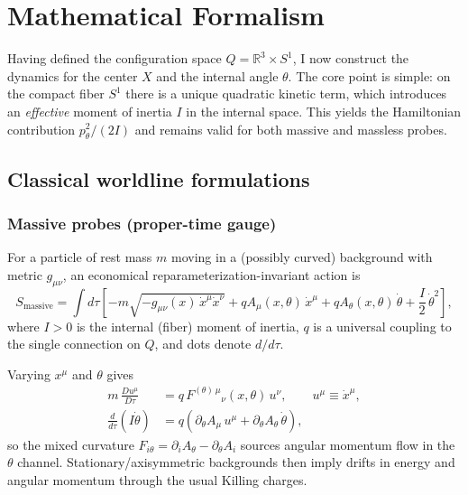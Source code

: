 \section{Mathematical Formalism}
\label{sec:math_formalism}

Having defined the configuration space $Q=\mathbb{R}^3\times S^1$, I now construct the
dynamics for the center $X$ and the internal angle $\theta$. The core point is simple:
on the compact fiber $S^1$ there is a unique quadratic kinetic term, which introduces an
\emph{effective} moment of inertia $I$ in the internal space. This yields the
Hamiltonian contribution $p_\theta^2/(2I)$ and remains valid for both massive and
massless probes.

\subsection{Classical worldline formulations}

\subsubsection{Massive probes (proper-time gauge)}
For a particle of rest mass $m$ moving in a (possibly curved) background with metric $g_{\mu\nu}$,
an economical reparameterization-invariant action is
\begin{equation}
S_\text{massive}=\int d\tau\left[
 -m\sqrt{-g_{\mu\nu}(x)\,\dot x^\mu \dot x^\nu}
 + q A_\mu(x,\theta)\,\dot x^\mu
 + q A_\theta(x,\theta)\,\dot\theta
 + \frac{I}{2}\,\dot\theta^2
\right],
\label{eq:Smassive}
\end{equation}
where $I>0$ is the internal (fiber) moment of inertia, $q$ is a universal coupling to the
single connection on $Q$, and dots denote $d/d\tau$.

Varying $x^\mu$ and $\theta$ gives
\begin{align}
m\,\frac{D u^\mu}{D\tau} &= q\,F^{(\theta)\,\mu}{}_{\nu}(x,\theta)\,u^\nu,
\qquad u^\mu\equiv \dot x^\mu,
\label{eq:centerEOM}
\\
\frac{d}{d\tau}(I\dot\theta) &= q\left(\partial_\theta A_\mu\,u^\mu+\partial_\theta A_\theta\,\dot\theta\right),
\label{eq:fiberEOM}
\end{align}
so the mixed curvature $F_{i\theta}=\partial_i A_\theta-\partial_\theta A_i$ sources angular momentum flow in the
$\theta$ channel. Stationary/axisymmetric backgrounds then imply drifts in energy and
angular momentum through the usual Killing charges.

